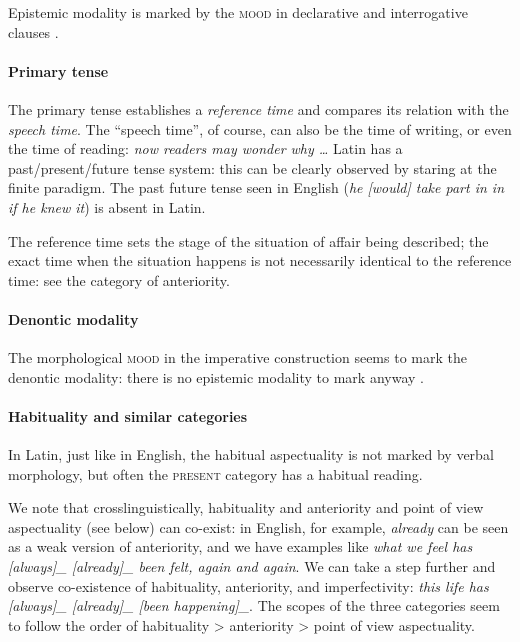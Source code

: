 \documentclass[a4paper, oneside, 12pt]{report}
\newcommand*{\citepage}[1]{p.~{#1}}
\newcommand{\form}[1]{\emph{#1}}
\newcommand*{\category}[1]{\textsc{#1}}
\begin{document}
Epistemic modality is marked by the \category{mood} in declarative and interrogative clauses 
\citep[\citepage{388}]{Pinkster1}.

\paragraph*{Primary tense}
The primary tense establishes a \emph{reference time}
and compares its relation with the \emph{speech time}.
The ``speech time'', of course, can also be the time of writing,
or even the time of reading: \form{now readers may wonder why \dots}
Latin has a past/present/future tense system:
this can be clearly observed by staring at the finite paradigm.
The past future tense seen in English (\form{he [would] take part in in if he knew it})
is absent in Latin.

The reference time sets the stage of the situation of affair being described;
the exact time when the situation happens is not necessarily identical to the reference time:
see the category of anteriority. 

\paragraph*{Denontic modality}
The morphological \category{mood} in the imperative construction
seems to mark the denontic modality:
there is no epistemic modality to mark anyway
\citep[\citepage{388}]{Pinkster1}.

\paragraph*{Habituality and similar categories}
In Latin, just like in English,
the habitual aspectuality is not marked by verbal morphology,
but often the \category{present} category has a habitual reading.

We note that crosslinguistically, 
habituality and anteriority and point of view aspectuality (see below) can co-exist:
in English, for example, \form{already} can be seen as a weak version of anteriority,
and we have examples like \form{what we feel has [always]_{} [already]_{\text{anteriority}} been felt, again and again}.
We can take a step further and observe co-existence of habituality, anteriority, and imperfectivity:
\form{this life has [always]_{} [already]_{\text{anteriority}} [been happening]_{\text{progressive}}}.
The scopes of the three categories seem to follow
the order of habituality \textgreater{} anteriority \textgreater{} point of view aspectuality.
\end{document}
